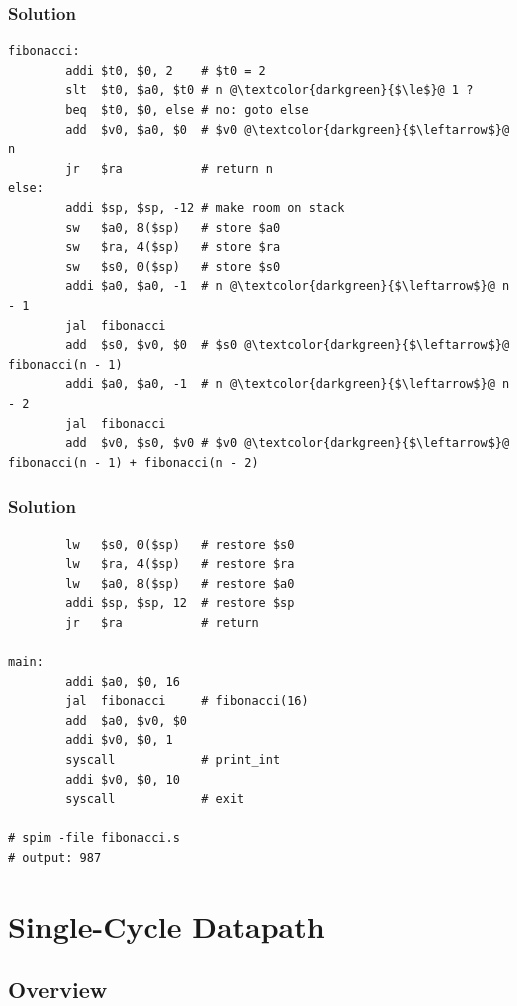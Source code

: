 \documentclass{beamer}
\begin{document}
\lstset{language=[mips]Assembler}

\ifanswers
\begin{frame}[fragile]
\frametitle{Solution}
\scriptsize
\begin{lstlisting}
fibonacci:
        addi $t0, $0, 2    # $t0 = 2
        slt  $t0, $a0, $t0 # n @\textcolor{darkgreen}{$\le$}@ 1 ?
        beq  $t0, $0, else # no: goto else
        add  $v0, $a0, $0  # $v0 @\textcolor{darkgreen}{$\leftarrow$}@ n
        jr   $ra           # return n
else:
        addi $sp, $sp, -12 # make room on stack
        sw   $a0, 8($sp)   # store $a0
        sw   $ra, 4($sp)   # store $ra
        sw   $s0, 0($sp)   # store $s0
        addi $a0, $a0, -1  # n @\textcolor{darkgreen}{$\leftarrow$}@ n - 1
        jal  fibonacci
        add  $s0, $v0, $0  # $s0 @\textcolor{darkgreen}{$\leftarrow$}@ fibonacci(n - 1)
        addi $a0, $a0, -1  # n @\textcolor{darkgreen}{$\leftarrow$}@ n - 2
        jal  fibonacci
        add  $v0, $s0, $v0 # $v0 @\textcolor{darkgreen}{$\leftarrow$}@ fibonacci(n - 1) + fibonacci(n - 2)
\end{lstlisting}

\end{frame}

\begin{frame}[fragile]
\frametitle{Solution}
\scriptsize
\begin{lstlisting}
        lw   $s0, 0($sp)   # restore $s0
        lw   $ra, 4($sp)   # restore $ra
        lw   $a0, 8($sp)   # restore $a0
        addi $sp, $sp, 12  # restore $sp
        jr   $ra           # return

main:
        addi $a0, $0, 16
        jal  fibonacci     # fibonacci(16)
        add  $a0, $v0, $0
        addi $v0, $0, 1
        syscall            # print_int
        addi $v0, $0, 10
        syscall            # exit

# spim -file fibonacci.s
# output: 987
\end{lstlisting}

\end{frame}

\fi

\section{Single-Cycle Datapath}

\subsection{Overview}
\end{document}
